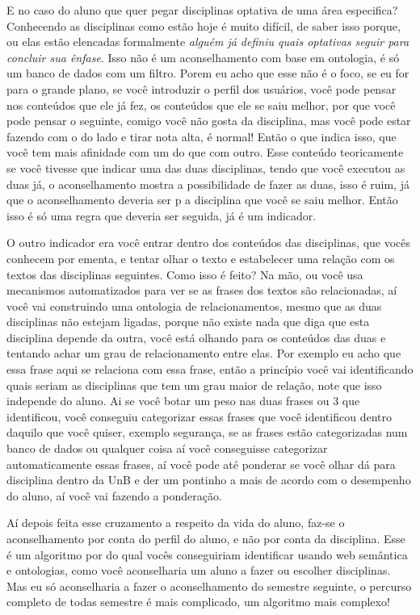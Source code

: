 \begin{enumerate}
		E no caso do aluno que quer pegar disciplinas optativa de uma área especifica? Conhecendo as disciplinas como estão hoje é muito difícil, de saber isso porque, ou elas estão elencadas formalmente \textit{alguém já definiu quais optativas seguir para concluir sua ênfase}. Isso não é um aconselhamento com base em ontologia, é só um banco de dados com um filtro. Porem eu acho que esse não é o foco, se eu for para o grande plano, se você introduzir o perfil dos usuários, você pode pensar nos conteúdos que ele já fez, os conteúdos que ele se saiu melhor, por que você pode pensar o seguinte, comigo você não gosta da disciplina, mas você pode estar fazendo com o do lado e tirar nota alta, é normal! Então o que indica isso, que você tem mais afinidade com um do que com outro. Esse conteúdo teoricamente se você tivesse que indicar uma das duas disciplinas, tendo que você executou as duas já, o aconselhamento mostra a possibilidade de fazer as duas, isso é ruim, já que o aconselhamento deveria ser p a disciplina que você se saiu melhor. Então isso é só uma regra que deveria ser seguida, já é um indicador.

		O outro indicador era você entrar dentro dos conteúdos das disciplinas, que vocês conhecem por ementa, e tentar olhar o texto e estabelecer uma relação com os textos das disciplinas seguintes. Como isso é feito? Na mão, ou você usa mecanismos automatizados para ver se as frases dos textos são relacionadas, aí você vai construindo uma ontologia de relacionamentos, mesmo que as duas disciplinas não estejam ligadas, porque não existe nada que diga que esta disciplina depende da outra, você está olhando para os conteúdos das duas e tentando achar um grau de relacionamento entre elas. Por exemplo eu acho que essa frase aqui se relaciona com essa frase, então a princípio você vai identificando quais seriam as disciplinas que tem um grau maior de relação, note que isso independe do aluno. Ai se você botar um peso nas duas frases ou 3 que identificou, você conseguiu categorizar essas frases que você identificou dentro daquilo que você quiser, exemplo segurança, se as frases estão categorizadas num banco de dados ou qualquer coisa aí você conseguisse categorizar automaticamente essas frases, aí você pode até ponderar se você olhar dá para disciplina dentro da UnB e der um pontinho a mais de acordo com o desempenho do aluno, aí você vai fazendo a ponderação.

		Aí depois feita esse cruzamento a respeito da vida do aluno, faz-se o aconselhamento por conta do perfil do aluno, e não por conta da disciplina. Esse é um algoritmo por do qual vocês conseguiriam identificar usando web semântica e ontologias, como você aconselharia um aluno a fazer ou escolher disciplinas. Mas eu só aconselharia a fazer o aconselhamento do semestre seguinte, o percurso completo de todas semestre é mais complicado, um algoritmo mais complexo!


\end{enumerate}